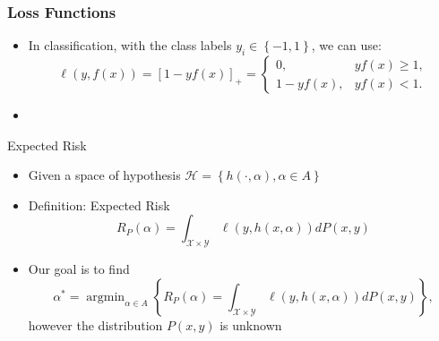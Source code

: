 \documentclass[aspectratio=43]{beamer}
\DeclareMathOperator*{\argmin}{arg\min}
\newcommand{\pospart}[1]{\left[#1\right]_{+}}
\newcommand{\set}[1]{\left\{#1\right\}}
\newcommand{\hypf}{h}
\newcommand{\hyp}[2]{\hypf\left(#1, #2\right)}
\newcommand{\opt}[1]{{#1}^*}
\newcommand{\hypspace}{\mathcal{H}}
\newcommand{\param}{\alpha}
\newcommand{\paramspace}{A}
\newcommand{\lossf}{\ell}
\newcommand{\distf}{P}
\newcommand{\risk}{R}
\newcommand{\exprisk}{\risk_\distf}
\newcommand{\Xspace}{\mathcal{X}}
\newcommand{\Yspace}{\mathcal{Y}}
\begin{document}
\begin{frame}
      \frametitle{Loss Functions}

      \begin{itemize}
            \item In classification, with the class labels $y_i \in \set{-1, 1}$, we can use:
            \begin{equation}
                  \nonumber
                  \lossf(y, f(x)) = \pospart{1 - yf(x)} = 
                  \begin{cases}
                      0, & y f(x) \geq 1 ,\\
                      1 - y f(x), & y f(x) < 1 .
                  \end{cases}
            \end{equation}
            \item 
      \end{itemize}

\end{frame}


\begin{frame}
      {Expected Risk}
      \begin{itemize}
            \item Given a space of hypothesis $\hypspace = \set{\hyp{\cdot}{\param}, \param \in \paramspace}$
            \item Definition: Expected Risk
            \begin{equation}
                  \nonumber
                  \exprisk(\param) = \int_{\Xspace \times \Yspace} \ell(y, \hyp{x}{\param}) d\distf(x, y)
            \end{equation}
            \item Our goal is to find 
            \begin{equation}
                  \nonumber
                  \opt{\param} = \argmin_{\param \in \paramspace} \left\{ \exprisk(\param) = \int_{\Xspace \times \Yspace} \ell(y, \hyp{x}{\param}) d\distf(x, y) \right\} ,
              \end{equation}
            however the distribution $\distf(x, y)$ is unknown
      \end{itemize}
      
\end{frame}
\end{document}
